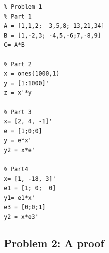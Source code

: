 \documentclass{article}
\begin{document}
\begin{enumerate}
\begin{lstlisting} 
% Problem 1
% Part 1
A = [1,1,2;  3,5,8; 13,21,34]
B = [1,-2,3; -4,5,-6;7,-8,9]
C= A*B

% Part 2 
x = ones(1000,1)
y = [1:1000]'
z = x'*y

% Part 3 
x= [2, 4, -1]'
e = [1;0;0]
y = e*x'
y2 = x*e'

% Part4 
x= [1, -18, 3]'
e1 = [1; 0;  0]
y1= e1*x'
e3 = [0;0;1]
y2 = x*e3'
 \end{lstlisting} 


\end{enumerate} 



\hypertarget{problem_2_a_proof_4}{}\subsection*{{Problem 2: A proof}}\label{problem_2_a_proof_4}
\end{document}
